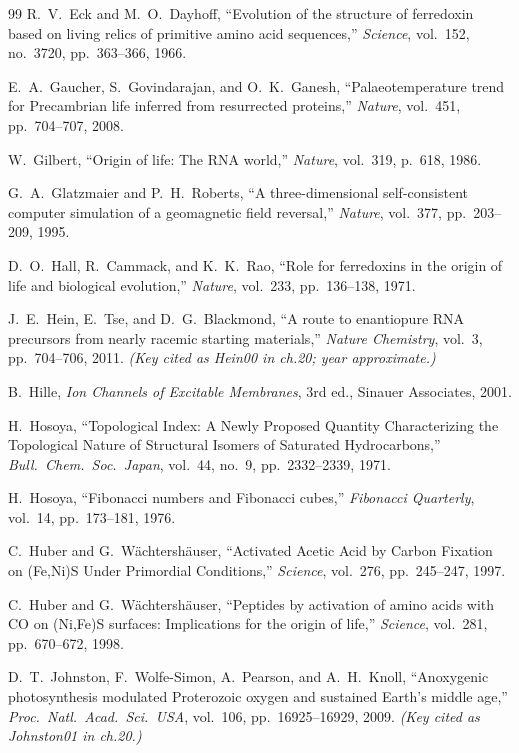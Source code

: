 \begin{thebibliography}{99}
R.~V.~Eck and M.~O.~Dayhoff,
``Evolution of the structure of ferredoxin based on living relics of primitive amino acid sequences,''
\emph{Science}, vol.~152, no.~3720, pp.~363--366, 1966.

E.~A.~Gaucher, S.~Govindarajan, and O.~K.~Ganesh,
``Palaeotemperature trend for Precambrian life inferred from resurrected proteins,''
\emph{Nature}, vol.~451, pp.~704--707, 2008.

W.~Gilbert,
``Origin of life: The RNA world,''
\emph{Nature}, vol.~319, p.~618, 1986.

G.~A.~Glatzmaier and P.~H.~Roberts,
``A three-dimensional self-consistent computer simulation of a geomagnetic field reversal,''
\emph{Nature}, vol.~377, pp.~203--209, 1995.

D.~O.~Hall, R.~Cammack, and K.~K.~Rao,
``Role for ferredoxins in the origin of life and biological evolution,''
\emph{Nature}, vol.~233, pp.~136--138, 1971.

J.~E.~Hein, E.~Tse, and D.~G.~Blackmond,
``A route to enantiopure RNA precursors from nearly racemic starting materials,''
\emph{Nature Chemistry}, vol.~3, pp.~704--706, 2011.
\textit{(Key cited as Hein00 in ch.20; year approximate.)}

B.~Hille,
\emph{Ion Channels of Excitable Membranes},
3rd ed., Sinauer Associates, 2001.

H.~Hosoya,
``Topological Index: A Newly Proposed Quantity Characterizing the Topological Nature of Structural Isomers of Saturated Hydrocarbons,''
\emph{Bull.\ Chem.\ Soc.\ Japan}, vol.~44, no.~9, pp.~2332--2339, 1971.

H.~Hosoya,
``Fibonacci numbers and Fibonacci cubes,''
\emph{Fibonacci Quarterly}, vol.~14, pp.~173--181, 1976.

C.~Huber and G.~W\"achtersh\"auser,
``Activated Acetic Acid by Carbon Fixation on (Fe,Ni)S Under Primordial Conditions,''
\emph{Science}, vol.~276, pp.~245--247, 1997.

C.~Huber and G.~W\"achtersh\"auser,
``Peptides by activation of amino acids with CO on (Ni,Fe)S surfaces:
Implications for the origin of life,''
\emph{Science}, vol.~281, pp.~670--672, 1998.

D.~T.~Johnston, F.~Wolfe-Simon, A.~Pearson, and A.~H.~Knoll,
``Anoxygenic photosynthesis modulated Proterozoic oxygen and sustained Earth's middle age,''
\emph{Proc.\ Natl.\ Acad.\ Sci.\ USA}, vol.~106, pp.~16925--16929, 2009.
\textit{(Key cited as Johnston01 in ch.20.)}


\end{thebibliography}

